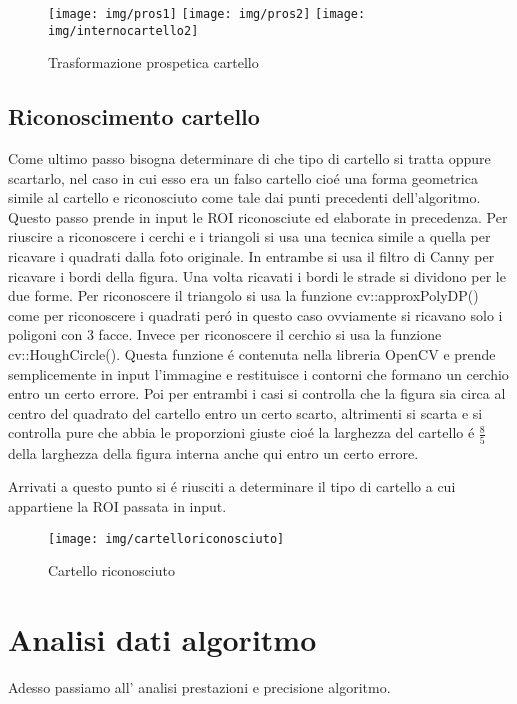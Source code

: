 	\begin{figure}[!ht]
		\centering
		\texttt{[image: img/pros1]}
		\texttt{[image: img/pros2]}
		\texttt{[image: img/internocartello2]}
		\caption{Trasformazione prospetica cartello}
	\end{figure}

\subsection{Riconoscimento cartello}

	Come ultimo passo bisogna determinare di che tipo di cartello si tratta oppure scartarlo, nel caso in cui esso era un falso cartello cio\'e una forma geometrica simile al cartello e riconosciuto come tale dai punti precedenti dell'algoritmo. Questo passo prende in input le ROI riconosciute ed elaborate in precedenza. Per riuscire a riconoscere i cerchi e i triangoli si usa una tecnica simile a quella per ricavare i quadrati dalla foto originale. In entrambe si usa il filtro di Canny per ricavare i bordi della figura. Una volta ricavati i bordi le strade si dividono per le due forme. Per riconoscere il triangolo si usa la funzione cv::approxPolyDP() come per riconoscere i quadrati per\'o in questo caso ovviamente si ricavano solo i poligoni con 3 facce. Invece per riconoscere il cerchio si usa la funzione cv::HoughCircle(). Questa funzione \'e contenuta nella libreria OpenCV e prende semplicemente in input l'immagine e restituisce i contorni che formano un cerchio entro un certo errore. Poi per entrambi i casi si controlla che la figura sia circa al centro del quadrato del cartello entro un certo scarto, altrimenti si scarta e si controlla pure che abbia le proporzioni giuste cio\'e la larghezza del cartello \'e $\frac{8}{5}$ della larghezza della figura interna anche qui entro un certo errore.

	Arrivati a questo punto si \'e riusciti a determinare il tipo di cartello a cui appartiene la ROI passata in input. 
	\begin{figure}[!ht]
		\centering
		\texttt{[image: img/cartelloriconosciuto]}
		\caption{Cartello riconosciuto}
	\end{figure}

\section{Analisi dati algoritmo}

	Adesso passiamo all' analisi prestazioni e precisione algoritmo.

